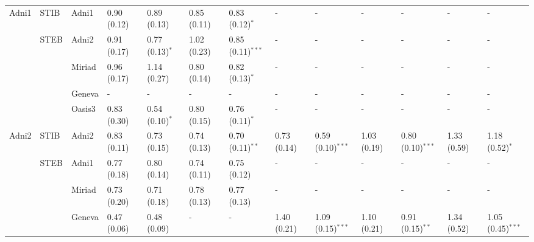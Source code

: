 \begin{table*}
{\begin{tabular}{lllllllllllll}
\cmidrule(lr){1-3}
Adni1  &           STIB  & Adni1           &  0.90 (0.12) &  0.89 (0.13)       &  0.85 (0.11) &  0.83 (0.12)$^{*}$   &            - &            -         &            - &            -         &            - &            -         \\
\cmidrule(lr){2-13}
       &           STEB  & Adni2           &  0.91 (0.17) &  0.77 (0.13)$^{*}$ &  1.02 (0.23) &  0.85 (0.11)$^{***}$ &            - &            -         &            - &            -         &            - &            -         \\
       &                 & Miriad          &  0.96 (0.17) &  1.14 (0.27)       &  0.80 (0.14) &  0.82 (0.13)$^{*}$   &            - &            -         &            - &            -         &            - &            -         \\
       &                 & Geneva          &            - &            -       &            - &            -         &            - &            -         &            - &            -         &            - &            -         \\
       &                 & Oasis3          &  0.83 (0.30) &  0.54 (0.10)$^{*}$ &  0.80 (0.15) &  0.76 (0.11)$^{*}$   &            - &            -         &            - &            -         &            - &            -         \\
\toprule
Adni2 &           STIB   & Adni2            &  0.83 (0.11) &  0.73 (0.15)       &  0.74 (0.13) &  0.70 (0.11)$^{**}$  &  0.73 (0.14) &  0.59 (0.10)$^{***}$ &  1.03 (0.19) &  0.80 (0.10)$^{***}$ &  1.33 (0.59) &  1.18 (0.52)$^{*}$   \\
\cmidrule(lr){2-13}
       &          STEB  & Adni1           &  0.77 (0.18) &  0.80 (0.14)       &  0.74 (0.11) &  0.75 (0.12)         &            - &            -         &            - &            -         &            - &            -         \\
       &                 & Miriad          &  0.73 (0.20) &  0.71 (0.18)       &  0.78 (0.13) &  0.77 (0.13)         &            - &            -         &            - &            -         &            - &            -         \\
       &                 & Geneva          &  0.47 (0.06) &  0.48 (0.09)       &            - &            -         &  1.40 (0.21) &  1.09 (0.15)$^{***}$ &  1.10 (0.21) &  0.91 (0.15)$^{**}$  &  1.34 (0.52) &  1.05 (0.45)$^{***}$ \\

\end{tabular}}
\end{table*}
